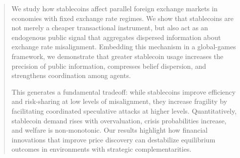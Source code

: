 \begin{abstract}
We study how stablecoins affect parallel foreign exchange markets in economies with fixed exchange rate regimes. We show that stablecoins are not merely a cheaper transactional instrument, but also act as an endogenous public signal that aggregates dispersed information about exchange rate misalignment. Embedding this mechanism in a global-games framework, we demonstrate that greater stablecoin usage increases the precision of public information, compresses belief dispersion, and strengthens coordination among agents. 

This generates a fundamental tradeoff: while stablecoins improve efficiency and risk-sharing at low levels of misalignment, they increase fragility by facilitating coordinated speculative attacks at higher levels. Quantitatively, stablecoin demand rises with overvaluation, crisis probabilities increase, and welfare is non-monotonic. Our results highlight how financial innovations that improve price discovery can destabilize equilibrium outcomes in environments with strategic complementarities.
\end{abstract}